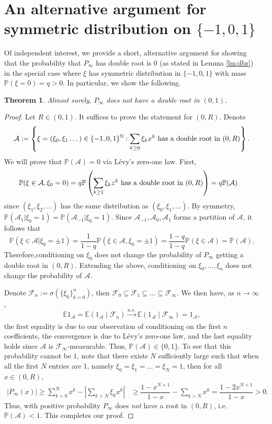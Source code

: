 \documentclass[12pt, reqno]{amsart}
\theoremstyle{plain}
\newtheorem{theorem}{Theorem}[section]
\theoremstyle{definition}
\newcommand\N{{\mathbb{N}}}
\renewcommand\P{{\mathbb{P}}}
\newcommand\E{{\mathbb{E}}}
\begin{document}
\section{An alternative argument for symmetric distribution on $\{-1, 0, 1\}$}\label{sec:shortTaylor}
Of independent interest, we provide a short, alternative argument for showing that the probability that $P_{\infty}$ has double root is 0 (as stated in Lemma \ref{lm:dbr}) in the special case where $\xi$ has symmetric distribution in $\{-1, 0, 1\}$ with mass $\P(\xi = 0) = q>0$. In particular, we show the following.
\begin{theorem}
Almost surely, $P_{\infty}$ does not have a double root in $(0, 1)$.
\end{theorem}
\begin{proof}
	Let $R\in (0, 1)$. It suffices to prove the statement for $(0, R)$.
Denote $$\mathcal A := \left\{{\bf \xi} = (\xi_0, \xi_1 \dots) \in \{-1, 0, 1\}^{\N}: \sum_{k \ge 0} \xi_k x^k \text{ has a double root in } (0, R)\right\}.$$
We will prove that $\P(\mathcal A) =0$ via L\'{e}vy's zero-one law. First,
	\begin{align*}
		\P({\bf \xi} \in \mathcal A, \xi_0=0) &= q\P\left(\sum_{k \ge 1} \xi_k z^k \text{ has a double root in } (0, R) \right)= q\P(\mathcal A)
	\end{align*}
	since $(\xi_1, \xi_2, \dots)$ has the same distribution as $(\xi_0, \xi_1, \dots)$.
	By symmetry, $\P(\mathcal A_1\vert \xi_0=1) = \P(\mathcal A_{-1}\vert \xi_0=1)$. 
	Since $ \mathcal A_{-1}, \mathcal A_0, \mathcal A_1$ forms a partition of $\mathcal A$, it follows that 
	$$\P(\xi\in \mathcal A\vert \xi_0=\pm 1) =  \frac{1}{1-q} \P(\xi\in \mathcal A, \xi_0=\pm 1) = \frac{1-q}{1-q} \P(\xi\in \mathcal A)=\P(\mathcal A).$$
	Therefore,conditioning on $\xi_0$ does not change the probability of $P_{\infty}$ getting a double root in $(0, R)$. Extending the above, conditioning on $\xi_0, \dots, \xi_n$ does not change the probability of $\mathcal A$.
	
	Denote $\mathcal F_n := \sigma\left( \{\xi_k\}_{k = 0}^n \right)$, then $\mathcal F_0 \subseteq \mathcal F_1 \subseteq \dots \subseteq \mathcal F_{\infty}$. We then have, as $n\to\infty$,
	$$ \E 1_{\mathcal A} = \E (1_{\mathcal A} \mid \mathcal F_n) \xrightarrow[]{a.s.} \E(1_{\mathcal A} \mid \mathcal F_{\infty}) = 1_{\mathcal A},$$
	the first equality is due to our observation of conditioning on the first $n$ coefficients, the convergence is due to L\'{e}vy's zero-one law, and the last equality holds since $\mathcal A$ is $\mathcal F_{\infty}$-measurable. Thus, $\P(\mathcal A) \in \{0, 1\}$. To see that this probability cannot be $1$, note that there exists $N$ sufficiently large such that when all the first $N$ entries are 1, namely $\xi_0 = \xi_1 = \dots = \xi_N = 1$, then for all $x \in (0, R)$, 
	\begin{align*}
	|P_\infty(x)|\ge	\sum_{k = 0}^N x^k - \left| \sum_{k > N} \xi_kx^k \right| &\ge \dfrac{1 - x^{N+1}}{1 - x} - \sum_{k >N} x^k = \dfrac{1 - 2x^{N+1}}{1 - x} > 0.
	\end{align*}
	Thus, with positive probability $P_{\infty}$ does \textit{not} have a root in $(0, R)$, i.e. $\P(\mathcal A) < 1$. This completes our proof.
\end{proof}



\end{document}
